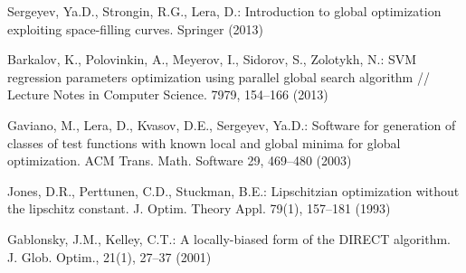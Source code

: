 \documentclass[smallcondensed]{svjour3}     %
\begin{document}
\begin{thebibliography}{}
Sergeyev, Ya.D., Strongin, R.G., Lera, D.: Introduction to global optimization exploiting space-filling curves. Springer (2013)

Barkalov, K., Polovinkin, A., Meyerov, I., Sidorov, S., Zolotykh, N.: SVM regression parameters optimization using parallel global search algorithm // Lecture Notes in Computer Science. 7979, 154--166 (2013)

Gaviano, M., Lera, D., Kvasov, D.E., Sergeyev, Ya.D.: Software for generation of classes of test functions with known local and global minima for global optimization. ACM Trans. Math. Software 29, 469--480 (2003)

Jones, D.R., Perttunen, C.D., Stuckman, B.E.: Lipschitzian optimization without the lipschitz constant. J. Optim. Theory Appl. 79(1), 157--181 (1993)

Gablonsky, J.M., Kelley, C.T.: A locally-biased form of the DIRECT algorithm. J. Glob. Optim., 21(1), 27--37 (2001)

\end{thebibliography}
\end{document}
